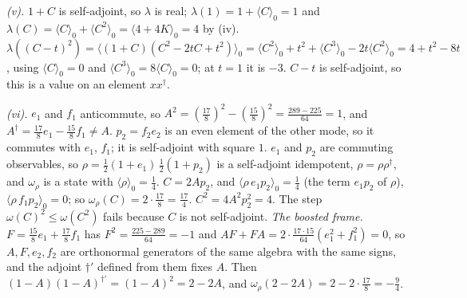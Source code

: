 \emph{(v).} $1 + C$ is self-adjoint, so $\lambda$ is real; $\lambda(1) = 1 + \langle C\rangle_{0} = 1$ and $\lambda(C) = \langle C\rangle_{0} + \langle C^{2}\rangle_{0} = \langle 4 + 4K\rangle_{0} = 4$ by (iv). $\lambda((C - t)^{2}) = \langle(1 + C)(C^{2} - 2tC + t^{2})\rangle_{0} = \langle C^{2}\rangle_{0} + t^{2} + \langle C^{3}\rangle_{0} - 2t\langle C^{2}\rangle_{0} = 4 + t^{2} - 8t$, using $\langle C\rangle_{0} = 0$ and $\langle C^{3}\rangle_{0} = 8\langle C\rangle_{0} = 0$; at $t = 1$ it is $-3$. $C - t$ is self-adjoint, so this is a value on an element $xx^{\dagger}$.

\emph{(vi).} $e_{1}$ and $f_{1}$ anticommute, so $A^{2} = (\tfrac{17}{8})^{2} - (\tfrac{15}{8})^{2} = \tfrac{289 - 225}{64} = 1$, and $A^{\dagger} = \tfrac{17}{8}e_{1} - \tfrac{15}{8}f_{1} \ne A$. $p_{2} = f_{2}e_{2}$ is an even element of the other mode, so it commutes with $e_{1}$, $f_{1}$; it is self-adjoint with square $1$. $e_{1}$ and $p_{2}$ are commuting observables, so $\rho = \tfrac12(1 + e_{1})\,\tfrac12(1 + p_{2})$ is a self-adjoint idempotent, $\rho = \rho\rho^{\dagger}$, and $\omega_{\rho}$ is a state with $\langle\rho\rangle_{0} = \tfrac14$. $C = 2Ap_{2}$, and $\langle\rho\,e_{1}p_{2}\rangle_{0} = \tfrac14$ (the term $e_{1}p_{2}$ of $\rho$), $\langle\rho\,f_{1}p_{2}\rangle_{0} = 0$; so $\omega_{\rho}(C) = 2 \cdot \tfrac{17}{8} = \tfrac{17}{4}$. $C^{2} = 4A^{2}p_{2}^{2} = 4$. The step $\omega(C)^{2} \le \omega(C^{2})$ fails because $C$ is not self-adjoint. \emph{The boosted frame.} $F = \tfrac{15}{8}e_{1} + \tfrac{17}{8}f_{1}$ has $F^{2} = \tfrac{225 - 289}{64} = -1$ and $AF + FA = 2 \cdot \tfrac{17 \cdot 15}{64}(e_{1}^{2} + f_{1}^{2}) = 0$, so $A, F, e_{2}, f_{2}$ are orthonormal generators of the same algebra with the same signs, and the adjoint $\dagger'$ defined from them fixes $A$. Then $(1 - A)(1 - A)^{\dagger'} = (1 - A)^{2} = 2 - 2A$, and $\omega_{\rho}(2 - 2A) = 2 - 2 \cdot \tfrac{17}{8} = -\tfrac94$.

